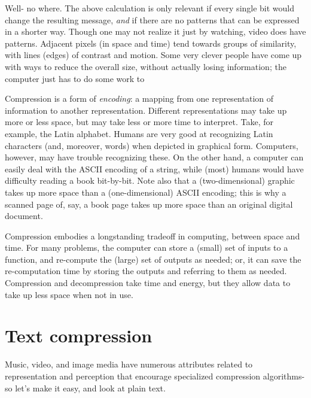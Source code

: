 Well- no where. The above calculation is only relevant if every single bit would change the resulting message, \textit{and} if there are no patterns that can be expressed in a shorter way. Though one may not realize it just by watching, video does have patterns. Adjacent pixels (in space and time) tend towards groups of similarity, with lines (edges) of contrast and motion. Some very clever people have come up with ways to reduce the overall size, without actually losing information; the computer just has to do some work to 

Compression is a form of \textit{encoding}: a mapping from one representation of information to another representation. Different representations may take up more or less space, but may take less or more time to interpret. Take, for example, the Latin alphabet. Humans are very good at recognizing Latin characters (and, moreover, words) when depicted in graphical form. Computers, however, may have trouble recognizing these. On the other hand, a computer can easily deal with the ASCII encoding of a string, while (most) humans would have difficulty reading a book bit-by-bit. Note also that a (two-dimensional) graphic takes up more space than a (one-dimensional) ASCII encoding; this is why a scanned page of, say, a book page takes up more space than an original digital document.



Compression embodies a longstanding tradeoff in computing, between space and time. For many problems, the computer can store a (small) set of inputs to a function, and re-compute the (large) set of outputs as needed; or, it can save the re-computation time by storing the outputs and referring to them as needed. Compression and decompression take time and energy, but they allow data to take up less space when not in use.

\section{Text compression}

Music, video, and image media have numerous attributes related to representation and perception that encourage specialized compression algorithms- so let's make it easy, and look at plain text.

